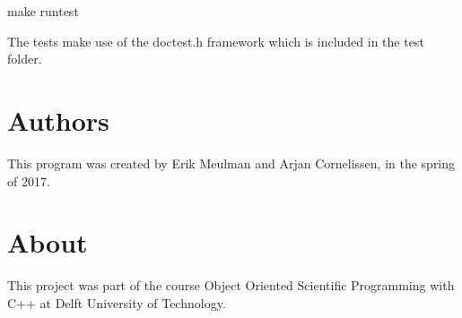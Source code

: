 \begin{DoxyCode}
make runtest
\end{DoxyCode}
 The tests make use of the {\ttfamily doctest.\+h} framework which is included in the {\ttfamily test} folder.\hypertarget{index_Authors}{}\section{Authors}\label{index_Authors}
This program was created by Erik Meulman and Arjan Cornelissen, in the spring of 2017.\hypertarget{index_About}{}\section{About}\label{index_About}
This project was part of the course Object Oriented Scientific Programming with C++ at Delft University of Technology. 